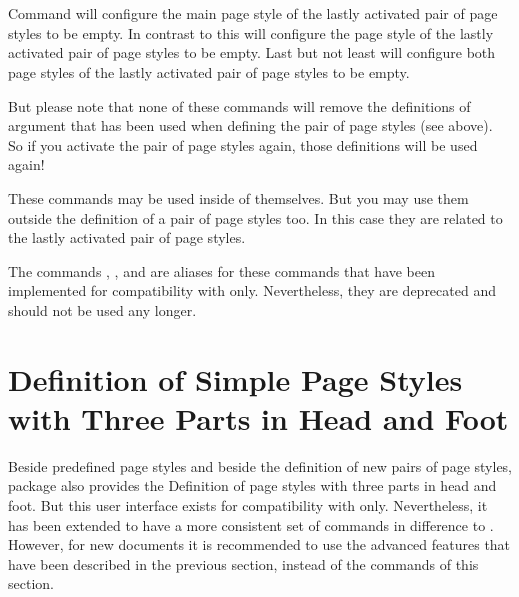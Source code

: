 \begin{Declaration}
  \\
  \\
\end{Declaration}
%
%
%
Command  will configure the main page style
of the lastly activated pair of page styles to be empty. In contrast to this
 will configure the  page
style of the lastly activated pair of page styles to be empty. Last but not
least  will configure both page styles of the
lastly activated pair of page styles to be empty.

But please note that none of these commands will remove
the definitions of argument  that has been used when
defining the pair of page styles (see above). So if you activate the pair of
page styles again, those definitions will be used again!

These commands may be used inside of  themselves. But you
may use them outside the definition of a pair of page styles too. In this case
they are related to the lastly activated pair of page styles.

%
%
%
The commands , , and
 are aliases for these commands that have been
implemented for compatibility with  only. Nevertheless, they
are deprecated and should not be used any longer.%
%
%
%
%
%
%
%


\section{Definition of Simple Page Styles with Three Parts in Head and Foot }
\label{sec:scrlayer-scrpage.pagestyle.triple}

Beside predefined page styles and beside the definition of new pairs of page
styles, package  also provides the Definition of
page styles with three parts in head and foot. But this user interface exists
for compatibility with  only. Nevertheless, it has been
extended to have a more consistent set of commands in difference to
. However, for new documents it is recommended to use the
advanced features that have been described in the previous section, instead
of the commands of this section.

